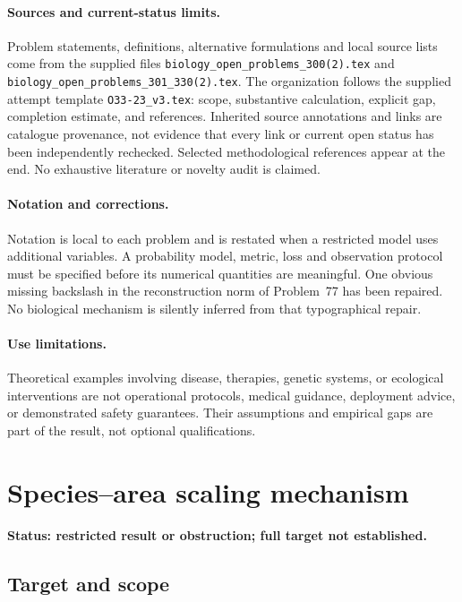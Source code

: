\documentclass[11pt]{article}
\begin{document}
\paragraph{Sources and current-status limits.}
Problem statements, definitions, alternative formulations and local source lists
come from the supplied files
\texttt{biology\_open\_problems\_300(2).tex} and
\texttt{biology\_open\_problems\_301\_330(2).tex}.
The organization follows the supplied attempt template
\texttt{O33-23\_v3.tex}: scope, substantive calculation, explicit gap,
completion estimate, and references. Inherited source annotations and links are
catalogue provenance, not evidence that every link or current open status has
been independently rechecked. Selected methodological references appear at the
end. No exhaustive literature or novelty audit is claimed.

\paragraph{Notation and corrections.}
Notation is local to each problem and is restated when a restricted model uses
additional variables. A probability model, metric, loss and observation protocol
must be specified before its numerical quantities are meaningful. One obvious
missing backslash in the reconstruction norm of Problem~77 has been repaired.
No biological mechanism is silently inferred from that typographical repair.

\paragraph{Use limitations.}
Theoretical examples involving disease, therapies, genetic systems, or ecological
interventions are not operational protocols, medical guidance, deployment advice,
or demonstrated safety guarantees. Their assumptions and empirical gaps are part
of the result, not optional qualifications.


\section*{Species–area scaling mechanism}
\label{prob:197}
\noindent\textbf{Status: restricted result or obstruction; full target not established.}
\subsection{Target and scope}
\end{document}
